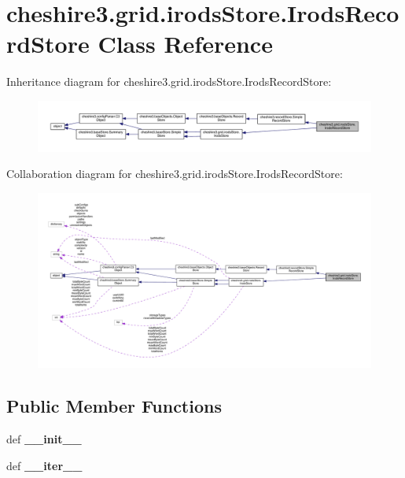 \hypertarget{classcheshire3_1_1grid_1_1irods_store_1_1_irods_record_store}{\section{cheshire3.\-grid.\-irods\-Store.\-Irods\-Record\-Store Class Reference}
\label{classcheshire3_1_1grid_1_1irods_store_1_1_irods_record_store}
}


Inheritance diagram for cheshire3.\-grid.\-irods\-Store.\-Irods\-Record\-Store\-:
\nopagebreak
\begin{figure}[H]
\begin{center}
\leavevmode
\includegraphics[width=350pt]{classcheshire3_1_1grid_1_1irods_store_1_1_irods_record_store__inherit__graph}
\end{center}
\end{figure}


Collaboration diagram for cheshire3.\-grid.\-irods\-Store.\-Irods\-Record\-Store\-:
\nopagebreak
\begin{figure}[H]
\begin{center}
\leavevmode
\includegraphics[width=350pt]{classcheshire3_1_1grid_1_1irods_store_1_1_irods_record_store__coll__graph}
\end{center}
\end{figure}
\subsection*{Public Member Functions}
\begin{DoxyCompactItemize}
\item 
\hypertarget{classcheshire3_1_1grid_1_1irods_store_1_1_irods_record_store_a6bd0bf4dbcbe4aecb250b40fb2df6199}{def {\bfseries \-\_\-\-\_\-init\-\_\-\-\_\-}}\label{classcheshire3_1_1grid_1_1irods_store_1_1_irods_record_store_a6bd0bf4dbcbe4aecb250b40fb2df6199}

\item 
\hypertarget{classcheshire3_1_1grid_1_1irods_store_1_1_irods_record_store_a3bcad215bac54a33ea8fa9156d7e6912}{def {\bfseries \-\_\-\-\_\-iter\-\_\-\-\_\-}}\label{classcheshire3_1_1grid_1_1irods_store_1_1_irods_record_store_a3bcad215bac54a33ea8fa9156d7e6912}

\end{DoxyCompactItemize}
